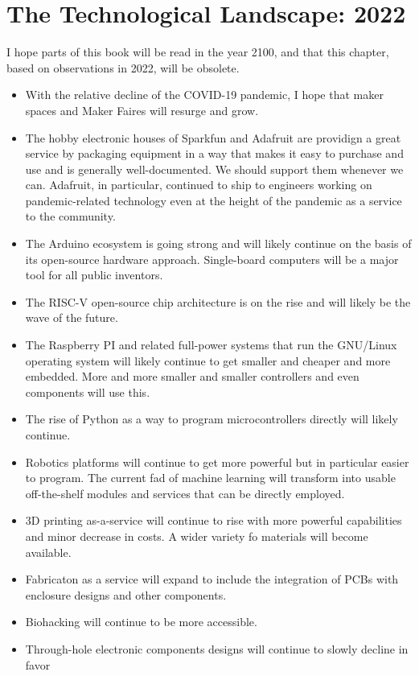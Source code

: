 \documentclass[
	fontsize=10pt, %
	twoside=false, %
	secnumdepth=1, %
]{kaobook}
\begin{document}
\chapter{The Technological Landscape: 2022}

I hope parts of this book will be read in the year 2100, and that this chapter,
based on observations in 2022,
will be obsolete.
\begin{itemize}
\item With the relative decline of the COVID-19 pandemic, I hope
  that maker spaces and Maker Faires will resurge and grow.
\item The hobby electronic houses of Sparkfun and Adafruit are
  providign a great service by packaging equipment in a way that
  makes it easy to purchase and use and is generally well-documented.
  We should support them whenever we can. Adafruit, in particular, continued
  to ship to engineers working on pandemic-related technology even at the height
  of the pandemic as a service to the community.
\item The Arduino ecosystem is going strong and will likely continue
  on the basis of its open-source hardware approach. Single-board computers
  will be a major tool for all public inventors.
\item The RISC-V open-source chip architecture is on the rise and will
  likely be the wave of the future.
\item The Raspberry PI and related full-power systems that run the GNU/Linux
  operating system will likely continue to get smaller and cheaper and more
  embedded. More and more smaller and smaller controllers and even components
  will use this.
\item The rise of Python as a way to program microcontrollers directly will
  likely continue.
\item Robotics platforms will continue to get more powerful but in particular
  easier to program. The current fad of machine learning will transform into
  usable off-the-shelf modules and services that can be directly employed.
\item 3D printing as-a-service will continue to rise with more powerful
  capabilities and minor decrease in costs. A wider variety fo materials
  will become available.
\item Fabricaton as a service will expand to include the integration
  of PCBs with enclosure designs and other components.
\item Biohacking will continue to be more accessible.
\item Through-hole electronic components designs will continue to slowly decline in favor

\end{itemize}
\end{document}
